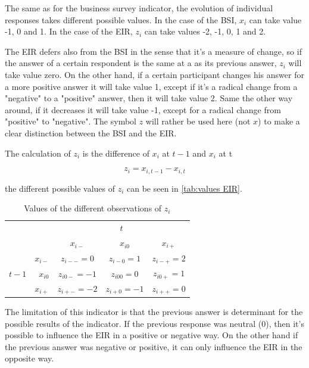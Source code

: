 \documentclass[12pt,a4paper,oneside]{book}
\begin{document}
The same as for the business survey indicator, the evolution of individual responses takes different possible values. In the case of the BSI, $x_i$ can take value -1, 0 and 1. In the case of the EIR, $z_i$ can take values -2, -1, 0, 1 and 2.

The EIR defers also from the BSI in the sense that it's a measure of change, so if the answer of a certain respondent is the same at a as its previous answer, $z_i$ will take value zero. 
On the other hand, if a certain participant changes his answer for a more positive answer it will take value 1, except if it's a radical change from a "negative" to a "positive" answer, then it will take value 2.
Same the other way around, if it decreases it will take value -1, except for a radical change from "positive" to "negative".
The symbol $z$ will rather be used here (not $x$) to make a clear distinction between the BSI and the EIR.

The calculation of $z_i$ is the difference of $x_i$ at $t-1$ and $x_i$ at t

\begin{equation}
    z_i = x_{i,t-1} - x_{i,t}
\end{equation}

the different possible values of $z_i$ can be seen in \autoref{tab:values EIR}. 

\begin{table}[htp!]
    \caption{Values of the different observations of $z_i$}
    \label{tab:values EIR}
    \centering \footnotesize
    \begin{tabular}{r | r | c c c | }
    \multicolumn{1}{r}{} & \multicolumn{1}{r}{} &    \multicolumn{3}{c}{$t$} \\ \cline{3-5}
    \multicolumn{1}{r}{} &         & \textbf{$x_{i-}$} & \textbf{$x_{i0}$} & \textbf{$x_{i+}$} \\ \cline{2-5}
           &    \textbf{$x_{i-}$} & $z_{i--}=0$    & $z_{i-0}=1$    & $z_{i-+}=2$ \\ 
    $t-1$ & \textbf{$x_{i0}$}  & $z_{i0-}=-1$    & $z_{i00}=0$    & $z_{i0+}=1$    \\
            & \textbf{$x_{i+}$}& $z_{i+-}=-2$    & $z_{i+0}=-1$    & $z_{i++}=0$ \\ \cline{2-5}
\end{tabular}
\end{table}


The limitation of this indicator is that the previous answer is determinant for the possible results of the indicator. 
If the previous response was neutral (0), then it's possible to influence the EIR in a positive or negative way. 
On the other hand if the previous answer was negative or positive, it can only influence the EIR in the opposite way.
\end{document}
